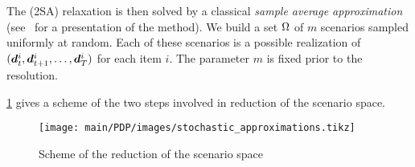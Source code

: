 The (2SA) relaxation is then solved by a classical {\em sample average approximation} (see~\cite{Kleywegt2002} for a presentation of the method).
We build a set $\Omega$ of $m$ scenarios sampled uniformly at random.
Each of these scenarios is a possible realization of $(\va\demand_t^i,\va\demand_{t+1}^i,\ldots,\va\demand_{\horizon}^i)$ for each item $i$.
The parameter $m$ is fixed prior to the resolution.


\cref{fig:scenario-space-reduction} gives a scheme of the two steps involved in reduction of the scenario space.
\begin{figure}[h]
  \centering
  \texttt{[image: main/PDP/images/stochastic\_approximations.tikz]}
  \caption{Scheme of the reduction of the scenario space}
  \label{fig:scenario-space-reduction}
\end{figure}


